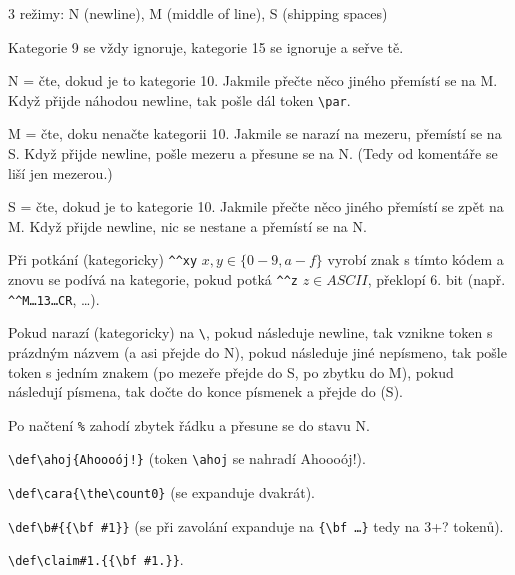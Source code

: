 \documentclass[12pt]{article}					%
\begin{document}
    \begin{definice}
        3 režimy: N (newline), M (middle of line), S (shipping spaces)

        Kategorie 9 se vždy ignoruje, kategorie 15 se ignoruje a seřve tě.

        N = čte, dokud je to kategorie 10. Jakmile přečte něco jiného přemístí se na M. Když přijde náhodou newline, tak pošle dál token \verb|\par|.

        M = čte, doku nenačte kategorii 10. Jakmile se narazí na mezeru, přemístí se na S. Když přijde newline, pošle mezeru a přesune se na N. (Tedy od komentáře se liší jen mezerou.)

        S = čte, dokud je to kategorie 10. Jakmile přečte něco jiného přemístí se zpět na M. Když přijde newline, nic se nestane a přemístí se na N.

        Při potkání (kategoricky) \verb|^^xy| $x, y \in \{0-9, a-f\}$ vyrobí znak s tímto kódem a znovu se podívá na kategorie, pokud potká \verb|^^z| $z \in ASCII$, překlopí 6. bit (např. \verb|^^M…13…CR|, …).

        Pokud narazí (kategoricky) na \verb|\|, pokud následuje newline, tak vznikne token s prázdným názvem (a asi přejde do N), pokud následuje jiné nepísmeno, tak pošle token s jedním znakem (po mezeře přejde do S, po zbytku do M), pokud následují písmena, tak dočte do konce písmenek a přejde do (S).

        Po načtení \verb|%| zahodí zbytek řádku a přesune se do stavu N.
    \end{definice}

    \begin{priklady}
        \verb|\def\ahoj{Ahoooój!}| (token \verb|\ahoj| se nahradí Ahoooój!).

        \verb|\def\cara{\the\count0}| (se expanduje dvakrát).

        \verb|\def\b#{{\bf #1}}| (se při zavolání expanduje na \verb|{\bf …}| tedy na 3+? tokenů).

        \verb|\def\claim#1.{{\bf #1.}}|.
    \end{priklady}
\end{document}
